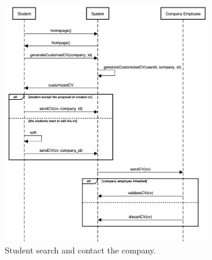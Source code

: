     \begin{figure}[H]
        \centering
        \includegraphics[width=0.8\textwidth]{RASD/Assets/SequenceDiagrams/3-student-contact-company.png}
        \caption{Student search and contact the company.}
        \label{fig:Student search and contact the company}
    \end{figure}

